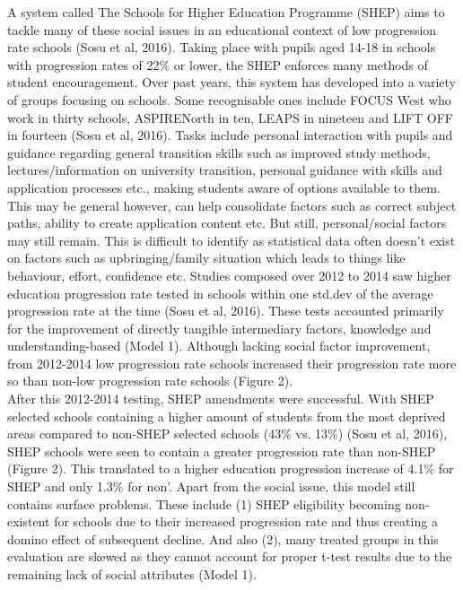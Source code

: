 \documentclass[11pt, english]{article}
\begin{document}
	A system called The Schools for Higher Education Programme (SHEP) aims to tackle many of these social issues in an educational context of low progression rate schools (Sosu et al, 2016). Taking place with pupils aged 14-18 in schools with progression rates of 22\% or lower, the SHEP enforces many methods of student encouragement. Over past years, this system has developed into a variety of groups focusing on schools. Some recognisable ones include FOCUS West who work in thirty schools, ASPIRENorth in ten, LEAPS in nineteen and LIFT OFF in fourteen (Sosu et al, 2016). Tasks include personal interaction with pupils and guidance regarding general transition skills such as improved study methods, lectures/information on university transition, personal guidance with skills and application processes etc., making students aware of options available to them. This may be general however, can help consolidate factors such as correct subject paths, ability to create application content etc. But still, personal/social factors may still remain. This is difficult to identify as statistical data often doesn't exist on factors such as upbringing/family situation which leads to things like behaviour, effort, confidence etc. Studies composed over 2012 to 2014 saw higher education progression rate tested in schools within one std.dev of the average progression rate at the time (Sosu et al, 2016). These tests accounted primarily for the improvement of directly tangible intermediary factors, knowledge and understanding-based (Model 1). Although lacking social factor improvement, from 2012-2014 low progression rate schools increased their progression rate more so than non-low progression rate schools (Figure 2).\\

	After this 2012-2014 testing, SHEP amendments were successful. With SHEP selected schools containing a higher amount of students from the most deprived areas compared to non-SHEP selected schools (43\% vs. 13\%) (Sosu et al, 2016), SHEP schools were seen to contain a greater progression rate than non-SHEP (Figure 2). This translated to a higher education progression increase of 4.1\% for SHEP and only 1.3\% for non'. Apart from the social issue, this model still contains surface problems. These include (1) SHEP eligibility becoming non-existent for schools due to their increased progression rate and thus creating a domino effect of subsequent decline. And also (2), many treated groups in this evaluation are skewed as they cannot account for proper t-test results due to the remaining lack of social attributes (Model 1).
		
\end{document}
